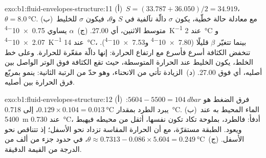 \begin{solution}{exo:b1:fluid-envelopes-structure:11}
(أ)~$S = (33.787 + 36.050)/2 = 34.919$، $\theta = \qty{8.0}{\celsius}$.
(ب)~مع معادلة حالة خطّية، يكون $\sigma$ دالّة تآلفية في $S$ و$\theta$، فيكون $\sigma$ للخليط متوسط الاثنين، أي 27.00.
(ج)~$\alpha$ يساوي \qty{0.75e-4}{K^{-1}} عند \qty{2}{\celsius} و
\qty{2.07e-4}{K^{-1}} عند \qty{14}{\celsius}، بينما تتغيّر $\beta$ قليلًا
(\num{7.80e-4} و\num{7.53e-4}). تنخفض الكثافة أسرع فأسرع مع ارتفاع الحرارة: إنها دالّة مقعّرة للحرارة. وعلى خط الخلط، يكون الخليط عند الحرارة المتوسطة، حيث تقع الكثافة فوق الوتر الواصل بين أصليه، أي فوق 27.00. (د)~الزيادة تأتي من الانحناء، وهو حدّ من الرتبة الثانية: ينمو بمربّع فرق الحرارة بين أصليه.
\end{solution}

\begin{solution}{exo:b1:fluid-envelopes-structure:12}
(أ)~فرق الضغط هو $5604 - 5500 = \qty{104}{dbar}$: يبرد الطرد بمقدار
$0.129 \times 0.104 = \qty{0.013}{\celsius}$، إلى \qty{0.718}{\celsius}.
(ب)~الماء المحيط به عند \qty{5400}{m} عند \qty{0.730}{\celsius}، أدفأ: فالطرد، بملوحة تكاد تكون نفسها، أثقل من محيطه فيهبط ويعود. الطبقة مستقرّة، مع أن الحرارة المقاسة تزداد نحو الأسفل؛ إذ تتناقص  نحو الأسفل. (ج)~$\theta \approx
0.7313 - 0.086 \times 5.604 = \qty{0.249}{\celsius}$، في حدود جزء من ألف من الدرجة من القيمة الدقيقة.
\end{solution}

